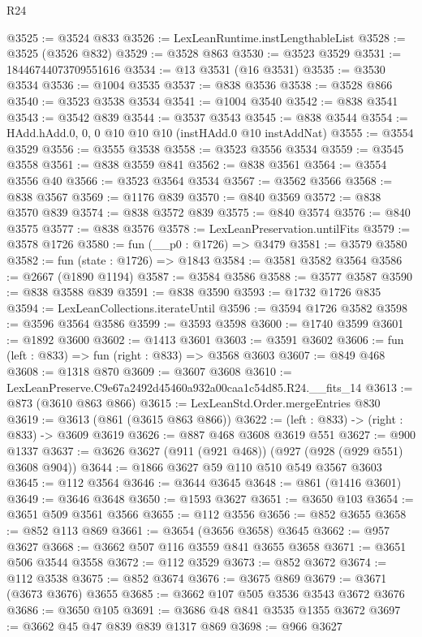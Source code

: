 \begin{lexlean}{R24}
\begin{coremodule}
@3525 := @3524 @833
@3526 := LexLeanRuntime.instLengthableList
@3528 := @3525 (@3526 @832)
@3529 := @3528 @863
@3530 := @3523 @3529
@3531 := 18446744073709551616
@3534 := @13 @3531 (@16 @3531)
@3535 := @3530 @3534
@3536 := @1004 @3535
@3537 := @838 @3536
@3538 := @3528 @866
@3540 := @3523 @3538 @3534
@3541 := @1004 @3540
@3542 := @838 @3541
@3543 := @3542 @839
@3544 := @3537 @3543
@3545 := @838 @3544
@3554 := HAdd.hAdd.{0, 0, 0} @10 @10 @10 (instHAdd.{0} @10 instAddNat)
@3555 := @3554 @3529
@3556 := @3555 @3538
@3558 := @3523 @3556 @3534
@3559 := @3545 @3558
@3561 := @838 @3559 @841
@3562 := @838 @3561
@3564 := @3554 @3556 @40
@3566 := @3523 @3564 @3534
@3567 := @3562 @3566
@3568 := @838 @3567
@3569 := @1176 @839
@3570 := @840 @3569
@3572 := @838 @3570 @839
@3574 := @838 @3572 @839
@3575 := @840 @3574
@3576 := @840 @3575
@3577 := @838 @3576
@3578 := LexLeanPreservation.untilFits
@3579 := @3578 @1726
@3580 := fun (__p0 : @1726) => @3479
@3581 := @3579 @3580
@3582 := fun (state : @1726) => @1843
@3584 := @3581 @3582 @3564
@3586 := @2667 (@1890 @1194)
@3587 := @3584 @3586
@3588 := @3577 @3587
@3590 := @838 @3588 @839
@3591 := @838 @3590
@3593 := @1732 @1726 @835
@3594 := LexLeanCollections.iterateUntil
@3596 := @3594 @1726 @3582
@3598 := @3596 @3564 @3586
@3599 := @3593 @3598
@3600 := @1740 @3599
@3601 := @1892 @3600
@3602 := @1413 @3601
@3603 := @3591 @3602
@3606 := fun (left : @833) => fun (right : @833) => @3568 @3603
@3607 := @849 @468
@3608 := @1318 @870
@3609 := @3607 @3608
@3610 := LexLeanPreserve.C9e67a2492d45460a932a00caa1c54d85.R24.__fits_14
@3613 := @873 (@3610 @863 @866)
@3615 := LexLeanStd.Order.mergeEntries @830
@3619 := @3613 (@861 (@3615 @863 @866))
@3622 := (left : @833) -> (right : @833) -> @3609 @3619
@3626 := @887 @468 @3608 @3619 @551
@3627 := @900 @1337
@3637 := @3626 @3627 (@911 (@921 @468)) (@927 (@928 (@929 @551) @3608 @904))
@3644 := @1866 @3627 @59 @110 @510 @549 @3567 @3603
@3645 := @112 @3564
@3646 := @3644 @3645
@3648 := @861 (@1416 @3601)
@3649 := @3646 @3648
@3650 := @1593 @3627
@3651 := @3650 @103
@3654 := @3651 @509 @3561 @3566
@3655 := @112 @3556
@3656 := @852 @3655
@3658 := @852 @113 @869
@3661 := @3654 (@3656 @3658) @3645
@3662 := @957 @3627
@3668 := @3662 @507 @116 @3559 @841 @3655 @3658
@3671 := @3651 @506 @3544 @3558
@3672 := @112 @3529
@3673 := @852 @3672
@3674 := @112 @3538
@3675 := @852 @3674
@3676 := @3675 @869
@3679 := @3671 (@3673 @3676) @3655
@3685 := @3662 @107 @505 @3536 @3543 @3672 @3676
@3686 := @3650 @105
@3691 := @3686 @48 @841 @3535 @1355 @3672
@3697 := @3662 @45 @47 @839 @839 @1317 @869
@3698 := @966 @3627

\end{coremodule}
\end{lexlean}
